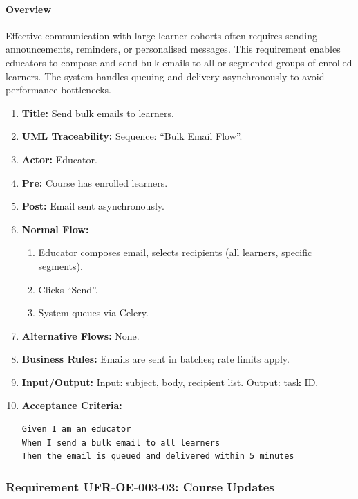 \paragraph{Overview}
Effective communication with large learner cohorts often requires sending announcements, reminders, or personalised messages. This requirement enables educators to compose and send bulk emails to all or segmented groups of enrolled learners. The system handles queuing and delivery asynchronously to avoid performance bottlenecks.
\begin{enumerate}[label=\textbf{\arabic*.}]
\item \textbf{Title:} Send bulk emails to learners.
\item \textbf{UML Traceability:} Sequence: “Bulk Email Flow”.
\item \textbf{Actor:} Educator.
\item \textbf{Pre:} Course has enrolled learners.
\item \textbf{Post:} Email sent asynchronously.
\item \textbf{Normal Flow:} 
    \begin{enumerate}
        \item Educator composes email, selects recipients (all learners, specific segments).
        \item Clicks “Send”.
        \item System queues via Celery.
    \end{enumerate}
\item \textbf{Alternative Flows:} None.
\item \textbf{Business Rules:} Emails are sent in batches; rate limits apply.
\item \textbf{Input/Output:} Input: subject, body, recipient list. Output: task ID.
\item \textbf{Acceptance Criteria:}
    \begin{verbatim}
Given I am an educator
When I send a bulk email to all learners
Then the email is queued and delivered within 5 minutes
    \end{verbatim}
\end{enumerate}

\subsubsection{Requirement UFR-OE-003-03: Course Updates}

